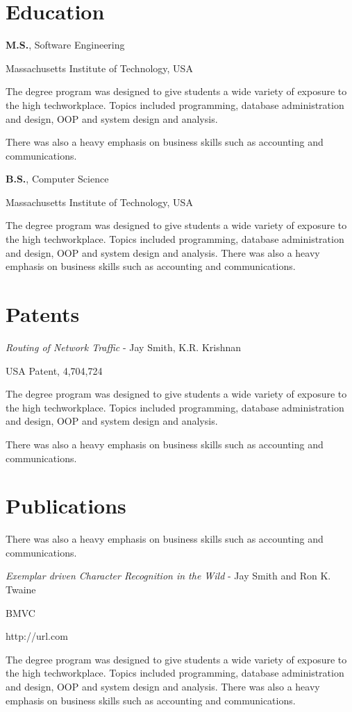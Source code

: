 \documentclass[11pt]{article}
\begin{document}
\section*{Education}
%
\begin{leftrulebox}[1/2012 -- current]
	\textbf{M.S.}, Software Engineering\par
	Massachusetts Institute of Technology, USA \par
	The degree program was designed to give students a wide variety of exposure to the high techworkplace.
    Topics included programming, database administration and design, OOP and system design and analysis.
	
	There was also a heavy emphasis on business skills such as accounting and communications.
    \par
\end{leftrulebox}
%
\begin{leftrulebox}[1/2012 -- 1/2013]
	\textbf{B.S.}, Computer Science \par
	Massachusetts Institute of Technology, USA \par
	The degree program was designed to give students a wide variety of exposure to the high techworkplace.
    Topics included programming, database administration and design, OOP and system design and analysis.
    There was also a heavy emphasis on business skills such as accounting and communications.
\end{leftrulebox}
%
\section*{Patents}
%
\begin{leftrulebox}[1/2013]
	\textit{Routing of Network Traffic} - Jay Smith, K.R. Krishnan \par
	USA Patent, 4,704,724 \par
	The degree program was designed to give students a wide variety of exposure to the high techworkplace. Topics
    included programming, database administration and design, OOP and system design and analysis.
	
	There was also a heavy emphasis on business skills such as accounting and communications.
\end{leftrulebox}
%
\section*{Publications}
%
\begin{leftrulebox}
	There was also a heavy emphasis on business skills such as accounting and communications.
\end{leftrulebox}
%
\begin{leftrulebox}[1/2013]
	\textit{Exemplar driven Character Recognition in the Wild} - Jay Smith and Ron K. Twaine \par
	BMVC \par
	http://url.com \par
	The degree program was designed to give students a wide variety of exposure to the high techworkplace.
    Topics included programming, database administration and design, OOP and system design and analysis.
	There was also a heavy emphasis on business skills such as accounting and communications.
\end{leftrulebox}
%
\end{document}
